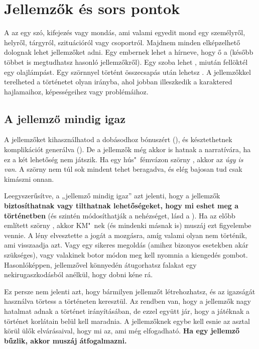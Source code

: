 \label{Jellemzők és sors pontok}
\chapter{Jellemzők és sors pontok}

A  az egy szó, kifejezés vagy mondás, ami valami egyedit mond egy személyről, helyről, tárgyról, szituációról vagy csoportról. Majdnem minden elképzelhető dolognak lehet jellemzőket adni. Egy embernek lehet a hírneve, hogy ő a  (később többet is megtudhatsz hasonló jellemzőkről). Egy szoba lehet , miután fellöktél egy olajlámpást. Egy szörnnyel történt összecsapás után lehetsz . A jellemzőkkel terelheted a történetet olyan irányba, ahol jobban illeszkedik a karaktered hajlamaihoz, képességeihez vagy problémáihoz.

\label{A jellemző mindig igaz}
\section{A jellemző mindig igaz}

A jellemzőket kihasználhatod a dobásodhoz bónuszért (), és késztethetnek komplikációt generálva (). De a jellemzők még akkor is hatnak a narratívára, ha ez a két lehetőség nem játszik. Ha egy hús"~fémvázon szörny , akkor az \emph{úgy is van}. A szörny nem túl sok mindent tehet beragadva, és elég bajosan tud csak kimászni onnan.

Leegyszerűsítve, a „jellemző mindig igaz” azt jelenti, hogy a jellemzők \textbf{biztosíthatnak vagy tilthatnak lehetőségeket, hogy mi eshet meg a történetben} (és szintén módosíthatják a nehézséget, lásd a ). Ha az előbb említett szörny , akkor KM"~nek (és mindenki másnak is) muszáj ezt figyelembe vennie. A lény elvesztette a jogát a mozgásra, amíg valami olyan nem történik, ami visszaadja azt. Vagy egy sikeres megoldás (amihez bizonyos esetekben akár  szükséges), vagy valakinek botor módon meg kell nyomnia a kiengedés gombot. Hasonlóképpen,  jellemzővel könnyedén átugorhatsz falakat egy nekirugaszkodásból anélkül, hogy dobni kéne rá.

Ez persze nem jelenti azt, hogy bármilyen jellemzőt létrehozhatsz, és az igazságát használva törtess a történeten keresztül. Az rendben van, hogy a jellemzők nagy hatalmat adnak a történet irányításában, de ezzel együtt jár, hogy a játéknak a történet korlátain belül kell maradnia. A jellemzőknek egybe kell esnie az asztal körül ülők elvárásaival, hogy mi az, ami még elfogadható. \textbf{Ha egy jellemző bűzlik, akkor muszáj átfogalmazni.}

